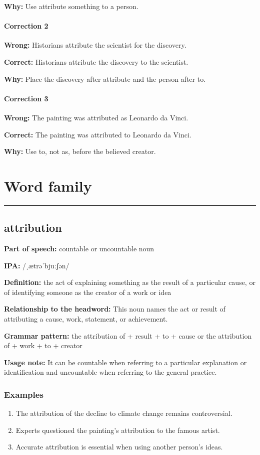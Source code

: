 \documentclass[11pt]{article}
\newcommand{\sectionrule}{\par\vspace{-0.5em}\noindent\textcolor{Accent}{\rule{\linewidth}{0.6pt}}\par}
\begin{document}
\textbf{Why:} Use attribute something to a person.

\paragraph{Correction 2}
\textbf{Wrong:} Historians attribute the scientist for the discovery.

\textbf{Correct:} Historians attribute the discovery to the scientist.

\textbf{Why:} Place the discovery after attribute and the person after to.

\paragraph{Correction 3}
\textbf{Wrong:} The painting was attributed as Leonardo da Vinci.

\textbf{Correct:} The painting was attributed to Leonardo da Vinci.

\textbf{Why:} Use to, not as, before the believed creator.

\section{Word family}
\sectionrule
\subsection{attribution}
\textbf{Part of speech:} countable or uncountable noun

\textbf{IPA:} /ˌætrəˈbjuːʃən/

\textbf{Definition:} the act of explaining something as the result of a particular cause, or of identifying someone as the creator of a work or idea

\textbf{Relationship to the headword:} This noun names the act or result of attributing a cause, work, statement, or achievement.

\textbf{Grammar pattern:} the attribution of + result + to + cause or the attribution of + work + to + creator

\textbf{Usage note:} It can be countable when referring to a particular explanation or identification and uncountable when referring to the general practice.

\subsubsection{Examples}
\begin{enumerate}
  \item The attribution of the decline to climate change remains controversial.
  \item Experts questioned the painting's attribution to the famous artist.
  \item Accurate attribution is essential when using another person's ideas.
\end{enumerate}
\end{document}
